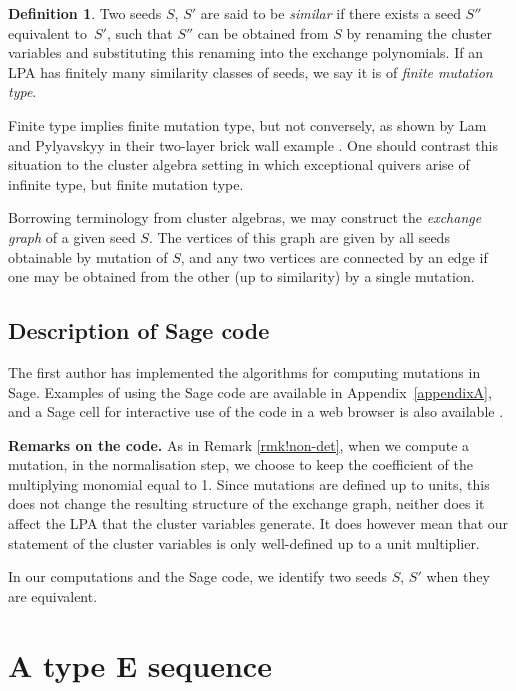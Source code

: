 \documentclass[10pt,a4paper]{amsart}
\numberwithin{equation}{section}
\theoremstyle{definition}
\newtheorem{defn}[thm]{Definition}
\begin{document}
\begin{defn}
	Two seeds $S$, $S'$ are said to be \textit{similar} if there exists a seed $S''$ equivalent to~$S'$, such that $S''$ can be obtained from $S$ by renaming the cluster variables and substituting this renaming into the exchange polynomials. If an LPA has finitely many similarity classes of seeds, we say it is of \textit{finite mutation type}.
\end{defn}

Finite type implies finite mutation type, but not conversely, as shown by Lam and Pylyavskyy in their two-layer brick wall example \cite[Section~7.2]{lp}. One should contrast this situation to the cluster algebra setting in which exceptional quivers arise of infinite type, but finite mutation type.

Borrowing terminology from cluster algebras, we may construct the \textit{exchange graph} of a given seed $S$. The vertices of this graph are given by all seeds obtainable by mutation of $S$, and any two vertices are connected by an edge if one may be obtained from the other (up to similarity) by a single mutation.

\subsection{Description of Sage code}

The first author has implemented the algorithms for computing mutations in Sage. Examples of using the Sage code are available in Appendix~\ref{appendixA}, and a Sage cell for interactive use of the code in a web browser is also available \cite{sagecode}.

{\bf Remarks on the code.}
As in Remark \ref{rmk!non-det}, when we compute a mutation, in the normalisation step, we choose to keep the coefficient of the multiplying monomial equal to 1. Since mutations are defined up to units, this does not change the resulting structure of the exchange graph, neither does it affect the LPA that the cluster variables generate. It does however mean that our statement of the cluster variables is only well-defined up to a unit multiplier.

In our computations and the Sage code, we identify two seeds $S$, $S'$ when they are equivalent.

\section[A type E sequence]{A type $\boldsymbol{E}$ sequence}
\end{document}
